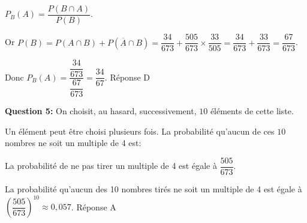 $P_B(A) = \dfrac{P(B \cap A)}{P(B)}$.

Or $P(B) = P(A \cap B) + P\left(\overline{A} \cap B \right) = \dfrac{34}{673} + \dfrac{505}{673} \times
\dfrac{33}{505} = \dfrac{34}{673} + \dfrac{33}{673}  = \dfrac{67}{673}$.

Donc $P_B(A) = \dfrac{\dfrac{34}{673}}{\dfrac{67}{673}} = \dfrac{34}{67}$. Réponse D


\medskip

\textbf{Question 5:} On choisit, au hasard, successivement, $10$ éléments de cette liste. 

Un élément peut être choisi plusieurs fois. La probabilité qu'aucun de ces $10$ nombres ne soit un multiple de 4 est:


La probabilité de ne pas tirer un multiple de 4 est égale à $\dfrac{505}{673}$.

La probabilité qu'aucun des 10 nombres tirés ne soit un multiple de 4 est égale à $\left(\dfrac{505}{673}\right)^{10} \approx 0,057$.
Réponse A
